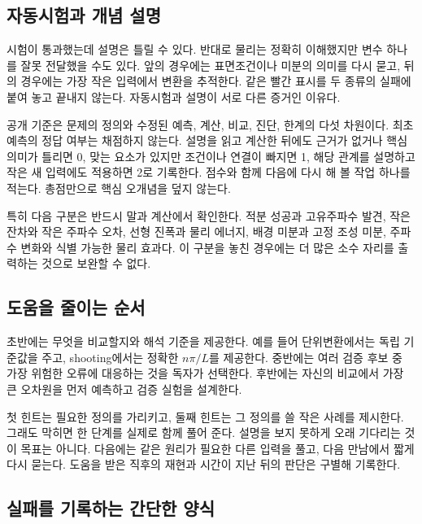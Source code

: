 \documentclass[
  10pt,
  a4paper,
]{article}
\begin{document}
\subsection{자동시험과 개념
설명}\label{uxc790uxb3d9uxc2dcuxd5d8uxacfc-uxac1cuxb150-uxc124uxba85}

시험이 통과했는데 설명은 틀릴 수 있다. 반대로 물리는 정확히 이해했지만
변수 하나를 잘못 전달했을 수도 있다. 앞의 경우에는 표면조건이나 미분의
의미를 다시 묻고, 뒤의 경우에는 가장 작은 입력에서 변환을 추적한다. 같은
빨간 표시를 두 종류의 실패에 붙여 놓고 끝내지 않는다. 자동시험과 설명이
서로 다른 증거인 이유다.

공개 기준은 문제의 정의와 수정된 예측, 계산, 비교, 진단, 한계의 다섯
차원이다. 최초 예측의 정답 여부는 채점하지 않는다. 설명을 읽고 계산한
뒤에도 근거가 없거나 핵심 의미가 틀리면 0, 맞는 요소가 있지만 조건이나
연결이 빠지면 1, 해당 관계를 설명하고 작은 새 입력에도 적용하면 2로
기록한다. 점수와 함께 다음에 다시 해 볼 작업 하나를 적는다. 총점만으로
핵심 오개념을 덮지 않는다.

특히 다음 구분은 반드시 말과 계산에서 확인한다. 적분 성공과 고유주파수
발견, 작은 잔차와 작은 주파수 오차, 선형 진폭과 물리 에너지, 배경 미분과
고정 조성 미분, 주파수 변화와 식별 가능한 물리 효과다. 이 구분을 놓친
경우에는 더 많은 소수 자리를 출력하는 것으로 보완할 수 없다.

\subsection{도움을 줄이는
순서}\label{uxb3c4uxc6c0uxc744-uxc904uxc774uxb294-uxc21cuxc11c}

초반에는 무엇을 비교할지와 해석 기준을 제공한다. 예를 들어
단위변환에서는 독립 기준값을 주고, shooting에서는 정확한 \(n\pi/L\)를
제공한다. 중반에는 여러 검증 후보 중 가장 위험한 오류에 대응하는 것을
독자가 선택한다. 후반에는 자신의 비교에서 가장 큰 오차원을 먼저 예측하고
검증 실험을 설계한다.

첫 힌트는 필요한 정의를 가리키고, 둘째 힌트는 그 정의를 쓸 작은 사례를
제시한다. 그래도 막히면 한 단계를 실제로 함께 풀어 준다. 설명을 보지
못하게 오래 기다리는 것이 목표는 아니다. 다음에는 같은 원리가 필요한
다른 입력을 풀고, 다음 만남에서 짧게 다시 묻는다. 도움을 받은 직후의
재현과 시간이 지난 뒤의 판단은 구별해 기록한다.

\subsection{실패를 기록하는 간단한
양식}\label{uxc2e4uxd328uxb97c-uxae30uxb85duxd558uxb294-uxac04uxb2e8uxd55c-uxc591uxc2dd}
\end{document}
